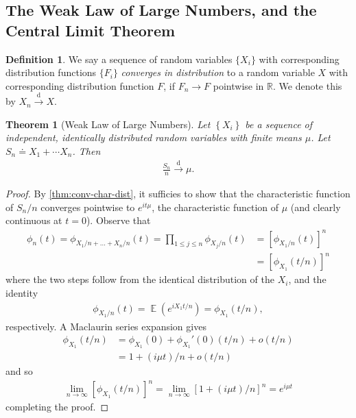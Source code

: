 \documentclass[12pt]{article}
\newcommand{\rr}{\mathbb{R}}
\DeclareMathOperator{\ex}{\mathbb{E}}
\theoremstyle{plain}
\newtheorem{theorem}{Theorem}
\theoremstyle{definition}
\newtheorem*{definition}{Definition}
\theoremstyle{remark}
\numberwithin{equation}{section}  %
\begin{document}
\subsection{The Weak Law of Large Numbers, and the Central Limit Theorem}
\begin{definition}
	We say a sequence of random variables $\{X_{i}\}$
	with corresponding distribution functions $\{F_{i}\}$
	\emph{converges in distribution} to a random variable $X$ with corresponding
	distribution function $F$, if $F_{n} \to F$ pointwise in $\rr$.
 We denote this by $X_{n} \xrightarrow{\text{d}} X$.
\end{definition}
\begin{theorem}[Weak Law of Large Numbers]\label{thm:weak-law}
	Let $\left\{ X_{i} \right\}$ be a sequence of independent, identically
	distributed random variables with finite means $\mu$. Let
	$S_{n} \doteq X_{1} + \cdots X_{n}$. Then
	\begin{equation*}
	\begin{split}
		\frac{S_{n}}{n} \xrightarrow{\text{d}} \mu.
	\end{split}
	\end{equation*}
\end{theorem}
\begin{proof}
	By \cref{thm:conv-char-dist}, it sufficies to show that
	the characteristic function of $S_{n}/n$ converges
	pointwise to  $e^{it \mu}$, the characteristic function of $\mu$ (and clearly
	continuous at $t=0$). Observe that
	\begin{equation*}
	\begin{split}
		\phi_{n}(t) = \phi_{X_{1}/n + \ldots + X_{n}/n}(t)
		= \prod_{1 \le j \le n} \phi_{X_{j}/n}(t)
		& = \left[ \phi_{X_{1}/n}(t) \right]^{n}
		\\
		& = \left[ \phi_{X_{1}}(t/n) \right]^{n}
	\end{split}
	\end{equation*}
	where the two steps follow from the identical distribution of the $X_{i}$,
	and the identity
	\begin{equation*}
	\begin{split}
		\phi_{X_{1}/n}(t) = \ex(e^{i X_{1} t /n}) = \phi_{X_{1}}(t/n),
	\end{split}
	\end{equation*}
respectively. A Maclaurin series expansion gives
\begin{equation*}
\begin{split}
	\phi_{X_{1}}(t/n) & = \phi_{X_{1}}(0) + \phi_{X_{1}}'(0)(t/n) + o(t/n)
	\\
	& = 1 + (i \mu t)/n + o(t/n)
\end{split}
\end{equation*}
and so
\begin{equation*}
\begin{split}
	\lim_{n \to \infty} \left[ \phi_{X_{1}}(t/n) \right]^{n}
	= \lim_{n \to \infty} \left[ 1 + (i \mu t)/n \right]^{n} = e^{i \mu t}
\end{split}
\end{equation*}
completing the proof.
\end{proof}
\end{document}
